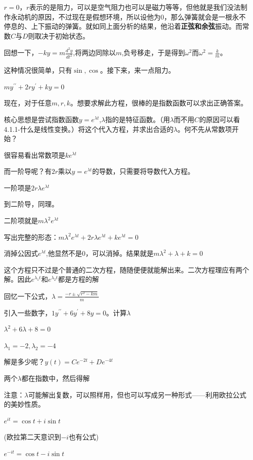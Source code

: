 \documentclass[UTF8]{ctexbook}
\newcommand{\derivative}{^\prime}
\newcommand{\doubleDerivative}{^{\prime\prime}}
\begin{document}
{{{{$r = 0$，$r$表示的是阻力，可以是空气阻力也可以是磁力等等，但他就是我们没法制作永动机的原因，不过现在是假想环境，所以设他为0，那么弹簧就会是一根永不停息的、上下振动的弹簧。就如同上面分析的结果，他沿着{\bfseries 正弦和余弦}振动。而常数$C$与$D$则取决于初始状态。

回想一下，$-ky = m\frac{d^2y}{dt^2}$,将两边同除以$m$,负号移走，于是得到$\omega^2$而$\omega^2 = \frac{k}{m}$。

这种情况很简单，只有$\sin , \cos$。接下来，来一点阻力。

$my\doubleDerivative + 2ry\derivative + ky = 0$

现在，对于任意$m,r,k$。想要求解此方程，很棒的是指数函数可以求出正确答案。

核心思想是尝试指数函数$y = e^{\lambda t}$,$\lambda$指的是特征函数。（用$\lambda$而不用$C$的原因可以看4.1.1-什么是线性变换。）将这个代入方程，并求出合适的$\lambda$。何不先从常数项开始？

很容易看出常数项是$ke^{\lambda t}$

而一阶导呢？有$2r$乘以$y = e^{\lambda t}$的导数，只需要将导数代入方程。

一阶项是$2r\lambda e^{\lambda t}$

到二阶导，同理。

二阶项就是$m\lambda^2e^{\lambda t}$

写出完整的形态：$m\lambda^2e^{\lambda t} + 2r\lambda e^{\lambda t} + ke^{\lambda t} = 0$

消掉公因式$e^{\lambda t}$,他显然不是0，可以消掉。结果就是$m\lambda^2 + \lambda + k= 0$

这个方程只不过是个普通的二次方程，随随便便就能解出来。二次方程理应有两个解。因此$e^{\lambda_1 t}$和$e^{\lambda_2 t}$都是方程的解

回忆一下公式，$\lambda = \frac{-r \pm \sqrt{r^2 - km}}{m}$

引入一些数字，$1y\doubleDerivative + 6y\derivative + 8y = 0$。计算$\lambda$

$\lambda^2 + 6\lambda + 8 = 0$

$\lambda_1 = -2, \lambda_2 = -4$

解是多少呢？$y(t) = Ce^{-2t} + De^{-4t}$

两个$\lambda$都在指数中，然后得解

注意：$\lambda$可能解出复数，可以照样用，但也可以写成另一种形式——利用欧拉公式的美妙性质。

$e^{it} = \cos t + i\sin t$

(欧拉第二天意识到$-i$也有公式)

$e^{-it} = \cos t -i\sin t$

}}}}
\end{document}
